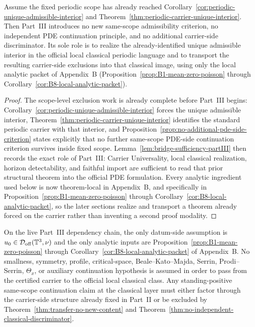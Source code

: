 \begin{manualproposition}
\label{prop:partIII-transport-only}
Assume the fixed periodic scope has already reached Corollary~\ref{cor:periodic-unique-admissible-interior} and Theorem~\ref{thm:periodic-carrier-unique-interior}. Then Part~III introduces no new same-scope admissibility criterion, no independent PDE continuation principle, and no additional carrier-side discriminator. Its sole role is to realize the already-identified unique admissible interior in the official local classical periodic language and to transport the resulting carrier-side exclusions into that classical image, using only the local analytic packet of Appendix~B (Proposition~\ref{prop:B1-mean-zero-poisson} through Corollary~\ref{cor:B8-local-analytic-packet}).
\end{manualproposition}

\begin{proof}
The scope-level exclusion work is already complete before Part~III begins: Corollary~\ref{cor:periodic-unique-admissible-interior} forces the unique admissible interior, Theorem~\ref{thm:periodic-carrier-unique-interior} identifies the standard periodic carrier with that interior, and Proposition~\ref{prop:no-additional-pde-side-criterion} states explicitly that no further same-scope PDE-side continuation criterion survives inside fixed scope. Lemma~\ref{lem:bridge-sufficiency-partIII} then records the exact role of Part~III: Carrier Universality, local classical realization, horizon detectability, and faithful import are sufficient to read that prior structural theorem into the official PDE formulation. Every analytic ingredient used below is now theorem-local in Appendix~B, and specifically in Proposition~\ref{prop:B1-mean-zero-poisson} through Corollary~\ref{cor:B8-local-analytic-packet}, so the later sections realize and transport a theorem already forced on the carrier rather than inventing a second proof modality.
\end{proof}

\begin{manualproposition}
\label{prop:no-hidden-transfer-hypothesis}
On the live Part~III dependency chain, the only datum-side assumption is $u_0\in\mathcal D_{\mathrm{off}}(\mathbb{T}^3,\nu)$ and the only analytic inputs are Proposition~\ref{prop:B1-mean-zero-poisson} through Corollary~\ref{cor:B8-local-analytic-packet} of Appendix~B. No smallness, symmetry, profile, critical-space, Beale--Kato--Majda, Serrin, Prodi--Serrin, $\Theta_x$, or auxiliary continuation hypothesis is assumed in order to pass from the certified carrier to the official local classical class. Any standing-positive same-scope continuation claim at the classical layer must either factor through the carrier-side structure already fixed in Part~II or be excluded by Theorem~\ref{thm:transfer-no-new-content} and Theorem~\ref{thm:no-independent-classical-discriminator}.
\end{manualproposition}

